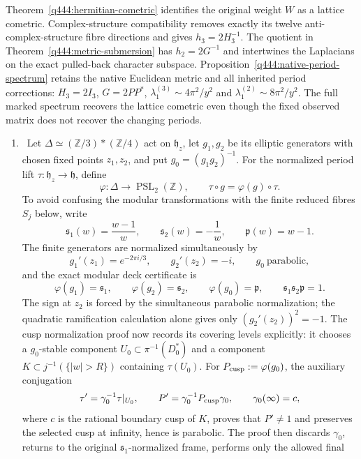 Theorem~\ref{q444:hermitian-cometric} identifies the original weight
$W$ as a lattice cometric. Complex-structure compatibility removes
exactly its twelve anti-complex-structure fibre directions and gives
$h_3=2H_3^{-1}$. The quotient in
Theorem~\ref{q444:metric-submersion} has $h_2=2G^{-1}$ and intertwines
the Laplacians on the exact pulled-back character subspace.
Proposition~\ref{q444:native-period-spectrum} retains the native
Euclidean metric and all inherited period corrections: $H_3=2I_3$,
$G=2PP^*$, $\lambda_1^{(3)}\sim4\pi^2/y^2$ and
$\lambda_1^{(2)}\sim8\pi^2/y^2$.
The full marked spectrum recovers the lattice cometric even though
the fixed observed matrix does not recover the changing periods.

\begin{enumerate}[leftmargin=1.8em]
\item \Verified\ Let
\(\Delta\simeq(\mathbb Z/3)*(\mathbb Z/4)\) act on
\(\mathfrak h_z\), let \(g_1,g_2\) be its elliptic generators with chosen
fixed points \(z_1,z_2\), and put \(g_0=(g_1g_2)^{-1}\).  For the normalized
period lift \(\tau:\mathfrak h_z\to\mathfrak h\), define
\[
 \varphi:\Delta\longrightarrow\operatorname{PSL}_2(\mathbb Z),
 \qquad \tau\circ g=\varphi(g)\circ\tau.
\]
To avoid confusing the modular transformations with the finite reduced
fibres \(S_j\) below, write
\[
 \mathfrak s_1(w)=\frac{w-1}{w},\qquad
 \mathfrak s_2(w)=-\frac1w,\qquad
 \mathfrak p(w)=w-1.
\]
The finite generators are normalized simultaneously by
\[
 g_1'(z_1)=e^{-2\pi i/3},\qquad g_2'(z_2)=-i,\qquad
 g_0\ \text{parabolic},
\]
and the exact modular deck certificate is
\[
 \varphi(g_1)=\mathfrak s_1,\qquad
 \varphi(g_2)=\mathfrak s_2,\qquad
 \varphi(g_0)=\mathfrak p,\qquad
 \mathfrak s_1\mathfrak s_2\mathfrak p=1.
\]
The sign at \(z_2\) is forced by the simultaneous parabolic normalization;
the quadratic ramification calculation alone gives only
\((g_2'(z_2))^2=-1\).  The cusp normalization proof now records its
covering levels explicitly: it chooses a \(g_0\)-stable component
\(U_0\subset\pi^{-1}(D_0^*)\) and a component
\(K\subset j^{-1}(\{|w|>R\})\) containing \(\tau(U_0)\).  For
\(P_{\rm cusp}:=\varphi(g_0)\), the auxiliary conjugation
\[
 \tau'=\gamma_0^{-1}\tau|_{U_0},\qquad
 P'=\gamma_0^{-1}P_{\rm cusp}\gamma_0,\qquad
 \gamma_0(\infty)=c,
\]
where \(c\) is the rational boundary cusp of \(K\), proves that
\(P'\ne1\) and preserves the selected cusp at infinity, hence
is parabolic.  The proof then discards \(\gamma_0\), returns to the original
\(\mathfrak s_1\)-normalized frame, performs only the allowed final

\end{enumerate}
